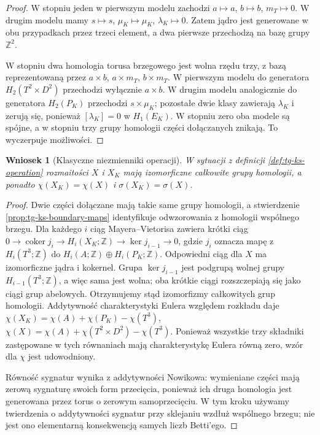 \documentclass[11pt,a4paper]{report}
\numberwithin{equation}{section}
\theoremstyle{plain}
\newtheorem{wniosek}[twierdzenie]{Wniosek}
\theoremstyle{definition}
\theoremstyle{remark}
\begin{document}
\begin{proof}
W stopniu jeden w pierwszym modelu zachodzi
$a\mapsto a$, $b\mapsto b$, $m_T\mapsto0$.
W drugim modelu mamy $s\mapsto s$,
$\mu_K\mapsto\mu_K$, $\lambda_K\mapsto0$.
Zatem jądro jest generowane w obu przypadkach
przez trzeci element, a dwa pierwsze przechodzą
na bazę grupy $\mathbb Z^2$.

W stopniu dwa homologia torusa brzegowego jest
wolna rzędu trzy, z bazą reprezentowaną przez
$a\times b$, $a\times m_T$, $b\times m_T$.
W pierwszym modelu do generatora $H_2(T^2\times D^2)$
przechodzi wyłącznie $a\times b$.
W drugim modelu analogicznie do generatora $H_2(P_K)$
przechodzi $s\times\mu_K$; pozostałe dwie klasy
zawierają $\lambda_K$ i zerują się, ponieważ
$[\lambda_K]=0$ w $H_1(E_K)$.
W stopniu zero oba modele są spójne, a w stopniu trzy
grupy homologii części dołączanych znikają. To
wyczerpuje możliwości.
\end{proof}

\begin{wniosek}[Klasyczne niezmienniki operacji]
\label{cor:tg-ks-invariants}
W sytuacji z definicji \ref{def:tg-ks-operation}
rozmaitości $X$ i $X_K$ mają izomorficzne
całkowite grupy homologii, a ponadto
$\chi(X_K)=\chi(X)$ i $\sigma(X_K)=\sigma(X)$.
\end{wniosek}

\begin{proof}
Dwie części dołączane mają takie same grupy homologii,
a stwierdzenie \ref{prop:tg-ks-boundary-maps} identyfikuje
odwzorowania z homologii wspólnego brzegu.
Dla każdego $i$ ciąg Mayera--Vietorisa zawiera krótki ciąg
$0\to\operatorname{coker}j_i\to H_i(X_K;\mathbb Z)
\to\ker j_{i-1}\to0$, gdzie $j_i$ oznacza mapę z
$H_i(T^3;\mathbb Z)$ do $H_i(A;\mathbb Z)\oplus H_i(P_K;\mathbb Z)$.
Odpowiedni ciąg dla $X$ ma izomorficzne jądra i kokernel.
Grupa $\ker j_{i-1}$ jest podgrupą wolnej grupy
$H_{i-1}(T^3;\mathbb Z)$, a więc sama jest wolna;
oba krótkie ciągi rozszczepiają się jako ciągi grup abelowych.
Otrzymujemy stąd izomorfizmy całkowitych grup homologii. Addytywność charakterystyki Eulera
względem rozkładu daje
$\chi(X_K)=\chi(A)+\chi(P_K)-\chi(T^3)$,
$\chi(X)=\chi(A)+\chi(T^2\times D^2)-\chi(T^3)$.
Ponieważ wszystkie trzy składniki zastępowane w tych
równaniach mają charakterystykę Eulera równą zero,
wzór dla $\chi$ jest udowodniony.

Równość sygnatur wynika z addytywności Nowikowa:
wymieniane części mają zerową sygnaturę swoich form
przecięcia, ponieważ ich druga homologia jest
generowana przez torus o zerowym samoprzecięciu.
W tym kroku używamy twierdzenia o addytywności
sygnatur przy sklejaniu wzdłuż wspólnego brzegu;
nie jest ono elementarną konsekwencją samych
liczb Betti'ego.
\end{proof}
\end{document}
